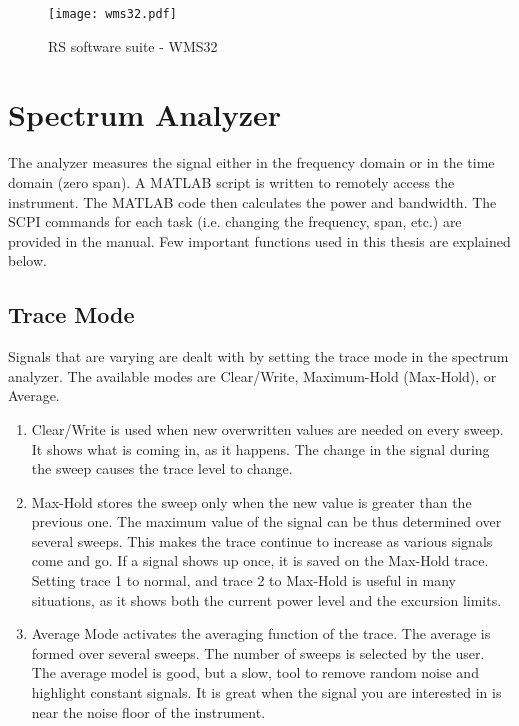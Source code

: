 \begin{figure}[H]
\centering
\texttt{[image: wms32.pdf]}
\caption{\acs{RS} software suite - WMS32}
\label{fig:softwaresuite}
\end{figure}

\section{Spectrum Analyzer}
The analyzer measures the signal either in the frequency domain or in the time domain (zero span). A MATLAB\textregistered{} script is written to remotely access the instrument. The MATLAB\textregistered{} code then calculates the power and bandwidth. The \acf{SCPI} commands for each task (i.e. changing the frequency, span, etc.) are provided in the manual. Few important functions used in this thesis are explained below.

\subsection{Trace Mode}
Signals that are varying are dealt with by setting the trace mode in the spectrum analyzer. The available modes are Clear/Write, Maximum-Hold (Max-Hold), or Average.
\begin{enumerate}
  \item Clear/Write is used when new overwritten values are needed on every sweep. It shows what is coming in, as it happens. The change in the signal during the sweep causes the trace level to change. 
  \item Max-Hold stores the sweep only when the new value is greater than the previous one. The maximum value of the signal can be thus determined over several sweeps. This makes the trace continue to increase as various signals come and go. If a signal shows up once, it is saved on the Max-Hold trace. Setting trace 1 to normal, and trace 2 to Max-Hold is useful in many situations, as it shows both the current power level and the excursion limits.  
  \item Average Mode activates the averaging function of the trace. The average is formed over several sweeps. The number of sweeps is selected by the user. The average model is good, but a slow, tool to remove random noise and highlight constant signals. It is great when the signal you are interested in is near the noise floor of the instrument.  
  \end{enumerate}


